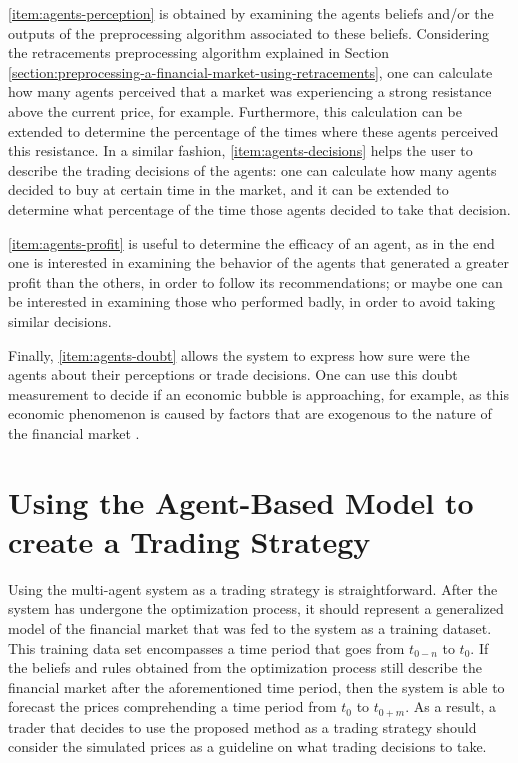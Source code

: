 \ref{item:agents-perception} is obtained by examining the agents beliefs and/or
the outputs of the preprocessing algorithm associated to these
beliefs. Considering the retracements preprocessing algorithm explained in
Section \ref{section:preprocessing-a-financial-market-using-retracements}, one
can calculate how many agents perceived that a market was experiencing a strong
resistance above the current price, for example. Furthermore, this calculation
can be extended to determine the percentage of the times where these agents
perceived this resistance. In a similar fashion, \ref{item:agents-decisions}
helps the user to describe the trading decisions of the agents: one can
calculate how many agents decided to buy at certain time in the market, and it
can be extended to determine what percentage of the time those agents decided to
take that decision.

\ref{item:agents-profit} is useful to determine the efficacy of an agent, as in
the end one is interested in examining the behavior of the agents that generated
a greater profit than the others, in order to follow its recommendations; or
maybe one can be interested in examining those who performed badly, in order to
avoid taking similar decisions.

Finally, \ref{item:agents-doubt} allows the system to express how sure were the
agents about their perceptions or trade decisions. One can use this doubt
measurement to decide if an economic bubble is approaching, for example, as this
economic phenomenon is caused by factors that are exogenous to the nature of the
financial market \cite{Martin2011}.

\section{Using the Agent-Based Model to create a Trading Strategy}
\label{section:using-the-agent-based-model-to-create-a-trading-strategy}

Using the multi-agent system as a trading strategy is straightforward. After the
system has undergone the optimization process, it should represent a
generalized model of the financial market that was fed to the system as a
training dataset. This training data set encompasses a time period that goes
from $t_{0-n}$ to $t_0$. If the beliefs and rules obtained from the optimization
process still describe the financial market after the aforementioned time
period, then the system is able to forecast the prices comprehending a time
period from $t_0$ to $t_{0+m}$. As a result, a trader that decides to use the
proposed method as a trading strategy should consider the simulated prices as a
guideline on what trading decisions to take.
